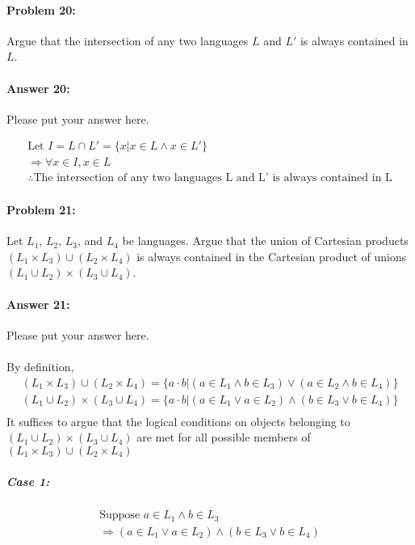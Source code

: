 \documentclass[10pt]{article}
\begin{document}
\paragraph{Problem 20:}
Argue that the intersection of any two languages $L$ and $L'$ is always
contained in $L$.
\paragraph{Answer 20:} Please put your answer here.

\begin{gather*}
    \text{Let } I = L \cap L' = \{x | x \in L \wedge x \in L'\}\\
    \Rightarrow  \forall x \in I, x\in L \\
    \therefore \text{The intersection of any two languages L and L' is always contained in L} 
\end{gather*}

\noindent\hrulefill %

\paragraph{Problem 21:}
Let $L_1$, $L_2$, $L_3$, and $L_4$ be languages. Argue that the union
of Cartesian products $(L_1 \times L_3) \cup (L_2 \times L_4)$ is
always contained in the Cartesian product of unions
$(L_1 \cup L_2) \times (L_3 \cup L_4)$.

\noindent
\paragraph{Answer 21:} Please put your answer here.\\
\noindent\\
By definition,
\begin{gather*}
    (L_1 \times L_3) \cup (L_2 \times L_4) = \{a\cdot b | (a\in L_1 \wedge b \in L_3) \vee (a\in L_2 \wedge b\in L_4)\}\\
    (L_1 \cup L_2) \times (L_3 \cup L_4) = \{a\cdot b | (a\in L_1 \vee a \in L_2) \wedge (b\in L_3 \vee b\in L_4)\}\\
\end{gather*}
\noindent
It suffices to argue that the logical conditions on objects belonging to $(L_1 \cup L_2) \times (L_3 \cup L_4)$ are met for all possible members of  $(L_1 \times L_3) \cup (L_2 \times L_4)$ 

\subparagraph{Case 1:}
\begin{gather*}
    \text{Suppose } a\in L_1 \wedge b\in L_3\\
    \Rightarrow (a\in L_1 \vee a\in L_2) \wedge (b\in L_3 \vee b\in L_4)
\end{gather*}
\end{document}
